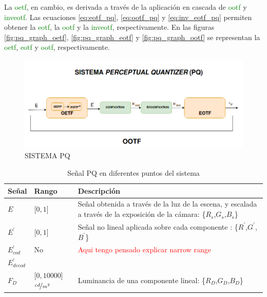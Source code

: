 \documentclass[a4paper, 12pt]{report}
\begin{document}
La \textcolor{green}{oetf}, en cambio, es derivada a través de la aplicación en cascada de \textcolor{green}{ootf} y \textcolor{green}{inveotf}.   
Las ecuaciones \ref{eq:eotf_pq}, \ref{eq:ootf_pq} y \ref{eq:inv_eotf_pq} permiten obtener la \textcolor{green}{eotf}, la \textcolor{green}{ootf} y la \textcolor{green}{inveotf}, respectivamente. En las figuras \ref{fig:pq_graph_oetf}, \ref{fig:pq_graph_eotf} y \ref{fig:pq_graph_ootf}  se representan la \textcolor{green}{oetf}, \textcolor{green}{eotf} y \textcolor{green}{ootf}, respectivamente.
\begin{figure}[H]
  \centering
  \includegraphics[width=12cm, keepaspectratio]{img/4_Formatos_de_TV_HDR/4_1_Sistema_PQ/1_Sistema_PQ.png}
  \caption{SISTEMA PQ}
  \label{fig:pq_sist}
\end{figure}

\begin{table}[H]
    \begin{tabular}{|p{1.25cm}| p{3cm}|p{10.5cm}| }
       \hline 
        \textbf{Señal} &\textbf{Rango} & \textbf{Descripción} \\ \hline
        $E$ &[$0,1$]  &  Señal obtenida a través de la luz de la escena, y escalada a través de la exposición de la cámara: \{$R_{s}$,$G_{s}$,$B_{s}$\}   \\\hline
        $E^{'}$ &[$0,1$]  & Señal no lineal aplicada sobre cada componente : \{$R^{'}$,$G^{'}$,$B^{'}$\} \\\hline
        $E^{'}_{cod}$&  No &  \textcolor{red}{Aqui tengo pensado explicar narrow range}\\\hline
        $E^{'}_{decod}$ &    & \\\hline
        $F_D$& [$0,10000$] $\nicefrac{cd}{m^{2}}$ & Luminancia de una componente lineal: \{$R_{D}$,$G_{D}$,$B_{D}$\} \\\hline
    \end{tabular}
    \caption{Señal PQ en diferentes puntos del sistema}
    \label{table:pq_params}
\end{table}
\end{document}
